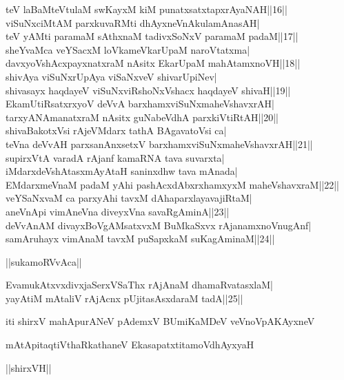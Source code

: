 \documentclass{article}
\begin{document}
teV laBaMteVtulaM swKayxM kiM punatxsatxtapxrAyaNAH||16||\\
viSuNxciMtAM parxkuvaRMti dhAyxneVnAkulamAnasAH|\\
teV yAMti paramaM sAthxnaM tadivxSoNxV paramaM padaM||17||\\
sheYvaMca veYSacxM loVkameVkarUpaM naroVtatxma|\\
davxyoVshAcxpayxnatxraM nAsitx EkarUpaM mahAtamxnoVH||18||\\
shivAya viSuNxrUpAya viSaNxveV shivarUpiNev|\\
shivasayx haqdayeV viSuNxviRshoNxVshacx haqdayeV shivaH||19||\\
EkamUtiRsatxrxyoV deVvA barxhamxviSuNxmaheVshavxrAH|\\
tarxyANAmanatxraM nAsitx guNabeVdhA parxkiVtiRtAH||20||\\
shivaBakotxVsi rAjeVMdarx tathA BAgavatoVsi ca|\\
teVna deVvAH parxsanAnxsetxV barxhamxviSuNxmaheVshavxrAH||21||\\
supirxVtA varadA rAjanf kamaRNA tava suvarxta|\\
iMdarxdeVshAtasxmAyAtaH saninxdhw tava mAnada|\\
EMdarxmeVnaM padaM yAhi pashAcxdAbxrxhamxyxM maheVshavxraM||22||\\
veYSaNxvaM ca parxyAhi tavxM dAhaparxlayavajiRtaM|\\
aneVnApi vimAneVna diveyxVna savaRgAminA||23||\\
deVvAnAM divayxBoVgAMsatxvxM BuMkaSxvx rAjanamxnoVnugAnf|\\
samAruhayx vimAnaM tavxM puSapxkaM suKagAminaM||24||\\

\begin{center}
||sukamoRVvAca||
\end{center}

EvamukAtxvxdivxjaSerxVSaThx rAjAnaM dhamaRvatasxlaM|\\
yayAtiM mAtaliV rAjAcnx pUjitasAsxdaraM tadA||25||

\begin{center}
iti shirxV mahApurANeV pAdemxV BUmiKaMDeV veVnoVpAKAyxneV
\end{center}

\begin{center}
mAtApitaqtiVthaRkathaneV EkasapatxtitamoVdhAyxyaH
\end{center}

\begin{center}
||shirxVH||
\end{center}
\end{document}
